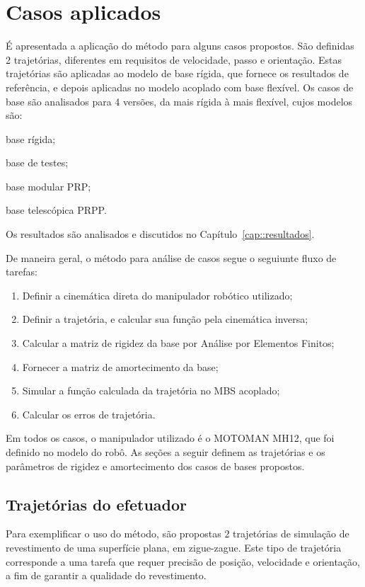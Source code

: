 \section{Casos aplicados}\label{sec::casos}

É apresentada a aplicação do método para alguns casos propostos. São definidas 2
trajetórias, diferentes em requisitos de velocidade, passo e orientação. Estas
trajetórias são aplicadas ao modelo de base rígida, que fornece os resultados de
referência, e depois aplicadas no modelo acoplado com base flexível. Os casos de
base são analisados para 4 versões, da mais rígida à mais flexível, cujos modelos são:
%
\begin{enumerate*}[label=\emph{\roman*})]
	\item base rígida;
	\item base de testes;
	\item base modular PRP;
	\item base telescópica PRPP.
\end{enumerate*}
%
Os resultados são analisados e discutidos no
Capítulo~\ref{cap::resultados}.

De maneira geral, o método para análise de casos segue o seguiunte fluxo de
tarefas:
%
\begin{enumerate}
  \item Definir a cinemática direta do manipulador robótico utilizado;
  \item Definir a trajetória, e calcular sua função pela cinemática inversa;
  \item Calcular a matriz de rigidez da base por Análise por Elementos Finitos;
  \item Fornecer a matriz de amortecimento da base;
  \item Simular a função calculada da trajetória no MBS acoplado;
  \item Calcular os erros de trajetória.
\end{enumerate}

Em todos os casos, o manipulador utilizado é o MOTOMAN MH12, que foi definido
no modelo do robô. As seções a seguir definem as trajetórias e os parâmetros
de rigidez e amortecimento dos casos de bases propostos.

\subsection{Trajetórias do efetuador}

Para exemplificar o uso do método, são propostas 2 trajetórias de simulação de
revestimento de uma superfície plana, em zigue-zague. Este tipo de trajetória
corresponde a uma tarefa que requer precisão de posição, velocidade e
orientação, a fim de garantir a qualidade do revestimento.

